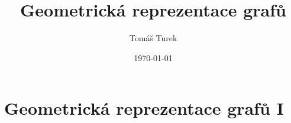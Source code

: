 \documentclass[12pt,a4paper]{report}
\title{Geometrická reprezentace grafů}
\author{Tomáš Turek}
\date{\today}
\begin{document}
	\maketitle
	\tableofcontents
	\part{Geometrická reprezentace grafů I}
\end{document}
